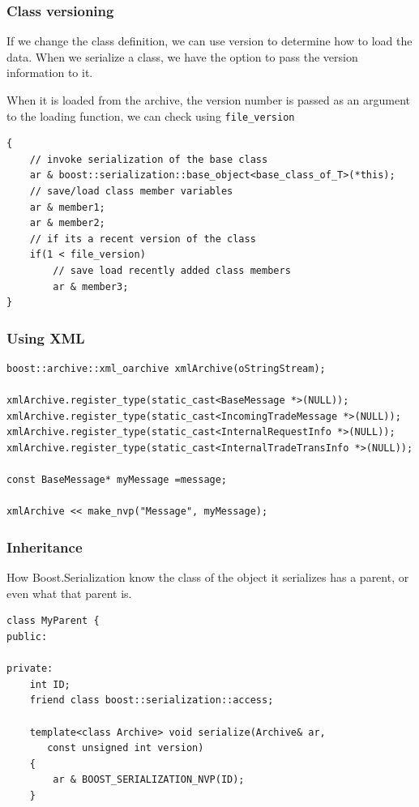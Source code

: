 \subsubsection{Class versioning}

If we change the class definition, we can use version to determine how to load
the data. When we serialize a class, we have the option to pass the version
information to it.

When it is loaded from the archive, the version number is passed as an argument
to the loading function, we can check using \verb!file_version!
\begin{verbatim}
{
    // invoke serialization of the base class 
    ar & boost::serialization::base_object<base_class_of_T>(*this);
    // save/load class member variables
    ar & member1;
    ar & member2;
    // if its a recent version of the class
    if(1 < file_version)
        // save load recently added class members
        ar & member3;
}
\end{verbatim}

\subsubsection{Using XML}

\begin{verbatim}
boost::archive::xml_oarchive xmlArchive(oStringStream);

xmlArchive.register_type(static_cast<BaseMessage *>(NULL));
xmlArchive.register_type(static_cast<IncomingTradeMessage *>(NULL));
xmlArchive.register_type(static_cast<InternalRequestInfo *>(NULL));
xmlArchive.register_type(static_cast<InternalTradeTransInfo *>(NULL));

const BaseMessage* myMessage =message;

xmlArchive << make_nvp("Message", myMessage);
\end{verbatim}

\subsubsection{Inheritance}

How Boost.Serialization know the class of the object it serializes has a parent,
or even what that parent is.

\begin{lstlisting}
class MyParent {
public:
	
private:
	int ID;
    friend class boost::serialization::access;
    
	template<class Archive> void serialize(Archive& ar,
       const unsigned int version) 
    {
		ar & BOOST_SERIALIZATION_NVP(ID);
	}	
\end{lstlisting}


